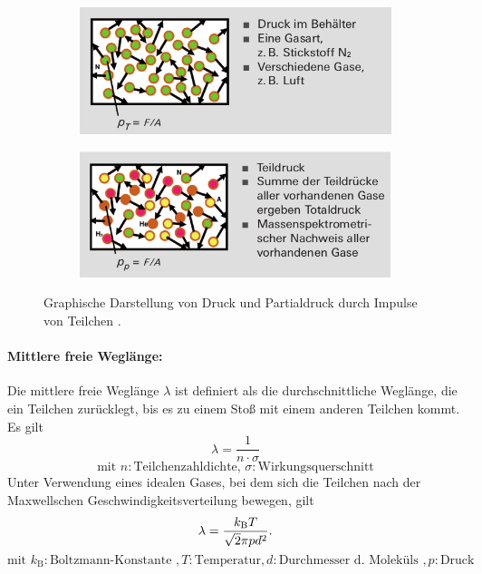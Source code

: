 \begin{figure}
  \centering
  \begin{subfigure}[b]{0.48\textwidth}
    \centering
    \includegraphics[width=\textwidth]{Druck.png}
  \end{subfigure}
  \begin{subfigure}[b]{0.49\textwidth}
    \centering
    \includegraphics[width=\textwidth]{Partialdruck.png}
  \end{subfigure}
  \caption{Graphische Darstellung von Druck und Partialdruck durch Impulse von Teilchen \cite{pfeiffer}.}
  \label{fig:Druck}
\end{figure}

\paragraph{Mittlere freie Weglänge:}
Die mittlere freie Weglänge $\lambda$ ist definiert als die durchschnittliche Weglänge, die
ein Teilchen zurücklegt, bis es zu einem Stoß mit einem anderen Teilchen kommt. Es gilt
\begin{equation}
  \lambda = \frac{1}{n\cdot\sigma}
  \label{eqn:Weglaenge}
\end{equation}
\begin{equation*}
  \text{mit }n:\text{Teilchenzahldichte, } \sigma:\text{Wirkungsquerschnitt}
\end{equation*}
Unter Verwendung eines idealen Gases, bei dem sich die Teilchen nach der Maxwellschen Geschwindigkeitsverteilung
bewegen, gilt
\begin{equation}
  \lambda = \frac{k_\text{B}T}{\sqrt{2}\pi p d^2}. \\
\end{equation}
\begin{equation*}
  \text{mit }k_\text{B}:\text{Boltzmann-Konstante }, T:\text{Temperatur}, d:\text{Durchmesser d. Moleküls }, p:\text{Druck}
\end{equation*}
